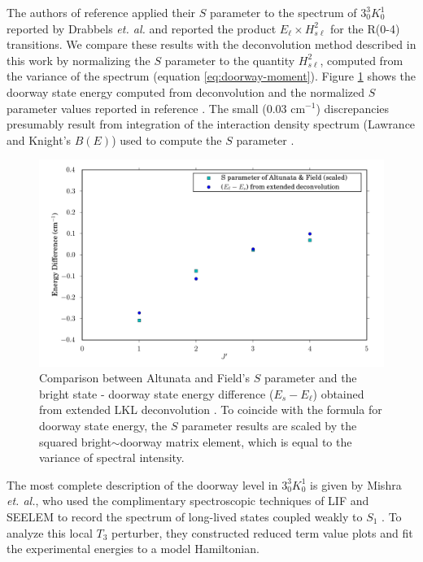 The authors of reference \cite{altunata01} applied their $S$ parameter
to the spectrum of $3^3_0K^1_0$ reported by Drabbels \emph{et. al.}
and reported the product $E_{\ell} \times H_{s\ell}^2$ for the R(0-4)
transitions.  We compare these results with the deconvolution method
described in this work by normalizing the $S$ parameter to the
quantity $H_{s\ell}^2$, computed from the variance of the spectrum
(equation \ref{eq:doorway-moment}).  Figure \ref{fig:selen-comparison}
shows the doorway state energy computed from deconvolution and the
normalized $S$ parameter values reported in reference
\cite{altunata01}.  The small (0.03 cm$^{-1}$) discrepancies
presumably result from integration of the interaction density spectrum
(Lawrance and Knight's $B(E)$) used to compute the $S$ parameter
\cite{lawrance85}.

\begin{figure}
  \caption{Comparison between Altunata and Field's $S$ parameter and
    the bright state - doorway state energy difference ($E_s -
    E_{\ell}$) obtained from extended LKL deconvolution
    \cite{altunata01}.  To coincide with the formula for doorway state
    energy, the $S$ parameter results are scaled by the squared
    bright$\sim$doorway matrix element, which is equal to the variance
    of spectral intensity.}
  \label{fig:selen-comparison}
  \centering
  \includegraphics[width=6.5in]{selen-comparison.png}
\end{figure}

The most complete description of the doorway level in $3^3_0K^1_0$ is
given by Mishra \emph{et. al.}, who used the complimentary
spectroscopic techniques of LIF and SEELEM to record the spectrum of
long-lived states coupled weakly to $S_1$ \cite{mishra04}.  To analyze
this local $T_3$ perturber, they constructed reduced term value plots
and fit the experimental energies to a model Hamiltonian.

